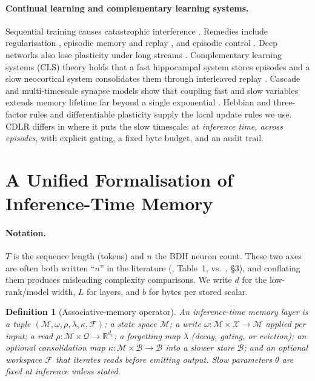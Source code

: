 \documentclass[11pt]{article}
\newtheorem{definition}{Definition}
\theoremstyle{remark}
\newcommand{\R}{\mathbb{R}}
\newcommand{\cdlr}{\textsc{CDLR}}
\begin{document}
\paragraph{Continual learning and complementary learning systems.} Sequential training causes catastrophic
interference \citep{mccloskey1989catastrophic,french1999catastrophic}. Remedies include regularisation
\citep{kirkpatrick2017ewc,zenke2017si}, episodic memory and replay \citep{lopezpaz2017gem,rolnick2019replay}, and
episodic control \citep{pritzel2017nec}. Deep networks also lose plasticity under long streams
\citep{dohare2024loss}. Complementary learning systems (CLS) theory holds that a fast hippocampal system stores
episodes and a slow neocortical system consolidates them through interleaved replay
\citep{mcclelland1995cls,kumaran2016cls}. Cascade and multi-timescale synapse models show that coupling fast and
slow variables extends memory lifetime far beyond a single exponential \citep{fusi2005cascade,benna2016consolidation}.
Hebbian and three-factor rules \citep{hebb1949organization,oja1982simplified,gerstner2018eligibility} and
differentiable plasticity \citep{miconi2018differentiable} supply the local update rules we use. \cdlr{} differs in where it puts the slow timescale: at
\emph{inference time, across episodes}, with explicit gating, a fixed byte budget, and an audit trail.

\section{A Unified Formalisation of Inference-Time Memory}
\label{sec:formal}

\paragraph{Notation.} $T$ is the sequence length (tokens) and $n$ the BDH neuron count. These two axes are often
both written ``$n$'' in the literature (\citealp{vaswani2017attention}, Table~1, vs.\ \citealp{kosowski2025bdh},
\S3), and conflating them produces misleading complexity comparisons. We write $d$ for the low-rank/model width,
$L$ for layers, and $b$ for bytes per stored scalar.

\begin{definition}[Associative-memory operator]
\label{def:amo}
An inference-time memory layer is a tuple $(\mathcal{M},\omega,\rho,\lambda,\kappa,\mathcal{F})$: a state space
$\mathcal{M}$; a \emph{write} $\omega:\mathcal{M}\times\mathcal{X}\to\mathcal{M}$ applied per input; a \emph{read}
$\rho:\mathcal{M}\times\mathcal{Q}\to\R^{d_v}$; a \emph{forgetting} map $\lambda$ (decay, gating, or eviction); an
optional \emph{consolidation} map $\kappa:\mathcal{M}\times\mathcal{B}\to\mathcal{B}$ into a slower store
$\mathcal{B}$; and an optional \emph{workspace} $\mathcal{F}$ that iterates reads before emitting output. Slow
parameters $\theta$ are fixed at inference unless stated.
\end{definition}
\end{document}
